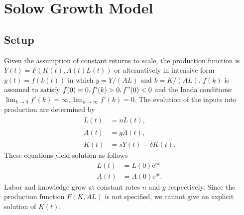\documentclass[12pt]{article} %
\newcommand{\e}{\mathrm{e}}
\begin{document}
\tableofcontents %

\newpage %


\section{Solow Growth Model} %



\subsection{Setup} %
Given the assumption of constant returns to scale, the production function is $Y(t)=F(K(t),A(t)L(t))$ or alternatively in intensive form $y(t)=f(k(t))$ in which $y=Y/(AL)$ and $k=K/(AL)$. $f(k)$ is assumed to satisfy $f(0)=0,f'(k)>0,f"(0)<0$ and the Inada conditions: $\lim_{k\rightarrow 0}f'(k)=\infty,\lim_{k\rightarrow \infty}f'(k)=0$. The evolution of the inputs into production are determined by
\begin{align*}
	\dot{L}(t) & =nL(t), \\
	\dot{A}(t) & =gA(t), \\
	\dot{K}(t) & =sY(t)-\delta K(t).
\end{align*}
These equations yield solution as follows
\begin{align*}
L(t) & =L(0)\e^{nt} \\
A(t) & =A(0)\e^{gt} .
\end{align*}
Labor and knowledge grow at constant rates $n$ and $g$ respectively. Since the production function $F(K,AL)$ is not specified, we cannot give an explicit solution of $K(t)$. 
\end{document}
